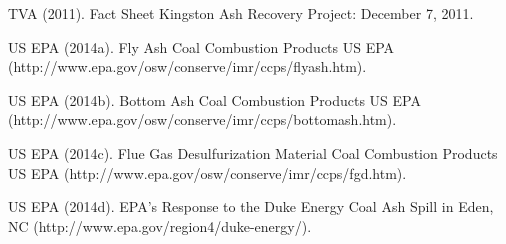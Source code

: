 \documentclass[ms]{uncgdissertationexp}
\theoremstyle{plain}
\theoremstyle{definition}
\theoremstyle{remark}
\begin{document}
  \hypertarget{ref-tvaFactSheetKingston2011}{}
  TVA (2011). Fact Sheet Kingston Ash Recovery Project: December 7, 2011.
  
  \hypertarget{ref-usepaFlyAshCoal2014}{}
  US EPA (2014a). Fly Ash \textbar{} Coal Combustion Products \textbar{}
  US EPA (http://www.epa.gov/osw/conserve/imr/ccps/flyash.htm).
  
  \hypertarget{ref-usepaBottomAshCoal2014}{}
  US EPA (2014b). Bottom Ash \textbar{} Coal Combustion Products
  \textbar{} US EPA
  (http://www.epa.gov/osw/conserve/imr/ccps/bottomash.htm).
  
  \hypertarget{ref-usepaFlueGasDesulfurization2014}{}
  US EPA (2014c). Flue Gas Desulfurization Material \textbar{} Coal
  Combustion Products \textbar{} US EPA
  (http://www.epa.gov/osw/conserve/imr/ccps/fgd.htm).
  
  \hypertarget{ref-usepaEPAResponseDuke2014}{}
  US EPA (2014d). EPA's Response to the Duke Energy Coal Ash Spill in
  Eden, NC (http://www.epa.gov/region4/duke-energy/).





\appendix


\end{document}
